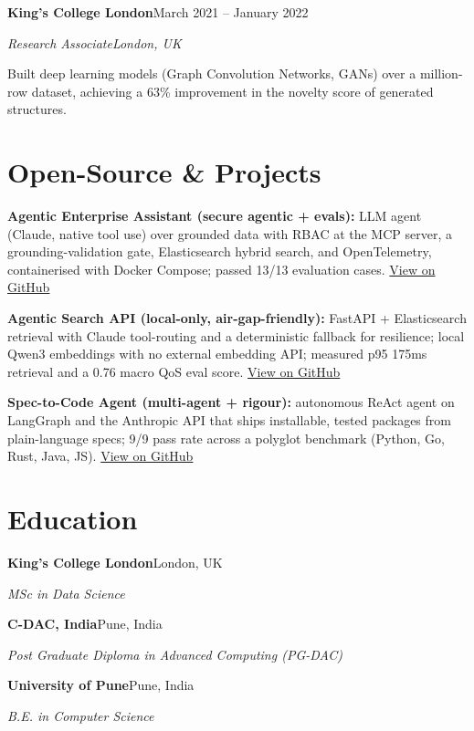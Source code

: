 \documentclass[10pt,a4paper]{article}
\newcommand{\entry}[4]{%
  {\color{company}\bfseries #1}\hfill {\color{muted}#2}\par
  \vspace{1pt}
  {\itshape #3}\hfill {\color{muted}\itshape #4}\par
  \vspace{3pt}%
}
\begin{document}
\entry{King's College London}{March 2021 -- January 2022}{Research Associate}{London, UK}
\begin{tight}
  \item Built deep learning models (Graph Convolution Networks, GANs) over a million-row dataset, achieving a 63\% improvement in the novelty score of generated structures.
\end{tight}

\section{Open-Source \& Projects}
\begin{tight}
  \item \textbf{Agentic Enterprise Assistant (secure agentic + evals):} LLM agent (Claude, native tool use) over grounded data with RBAC at the MCP server, a grounding-validation gate, Elasticsearch hybrid search, and OpenTelemetry, containerised with Docker Compose; passed 13/13 evaluation cases. \href{https://github.com/abhijeetscode/Agentic-Enterprise-Assistant}{View on GitHub}
  \item \textbf{Agentic Search API (local-only, air-gap-friendly):} FastAPI + Elasticsearch retrieval with Claude tool-routing and a deterministic fallback for resilience; local Qwen3 embeddings with no external embedding API; measured p95 175ms retrieval and a 0.76 macro QoS eval score. \href{https://github.com/abhijeetscode/search-agent}{View on GitHub}
  \item \textbf{Spec-to-Code Agent (multi-agent + rigour):} autonomous ReAct agent on LangGraph and the Anthropic API that ships installable, tested packages from plain-language specs; 9/9 pass rate across a polyglot benchmark (Python, Go, Rust, Java, JS). \href{https://github.com/abhijeetscode/Spec-to-Code-Agent}{View on GitHub}
\end{tight}

\section{Education}
{\color{company}\bfseries King's College London}\hfill {\color{muted}London, UK}\par
{\itshape MSc in Data Science}\par\vspace{2pt}
{\color{company}\bfseries C-DAC, India}\hfill {\color{muted}Pune, India}\par
{\itshape Post Graduate Diploma in Advanced Computing (PG-DAC)}\par\vspace{2pt}
{\color{company}\bfseries University of Pune}\hfill {\color{muted}Pune, India}\par
{\itshape B.E. in Computer Science}\par
\end{document}
